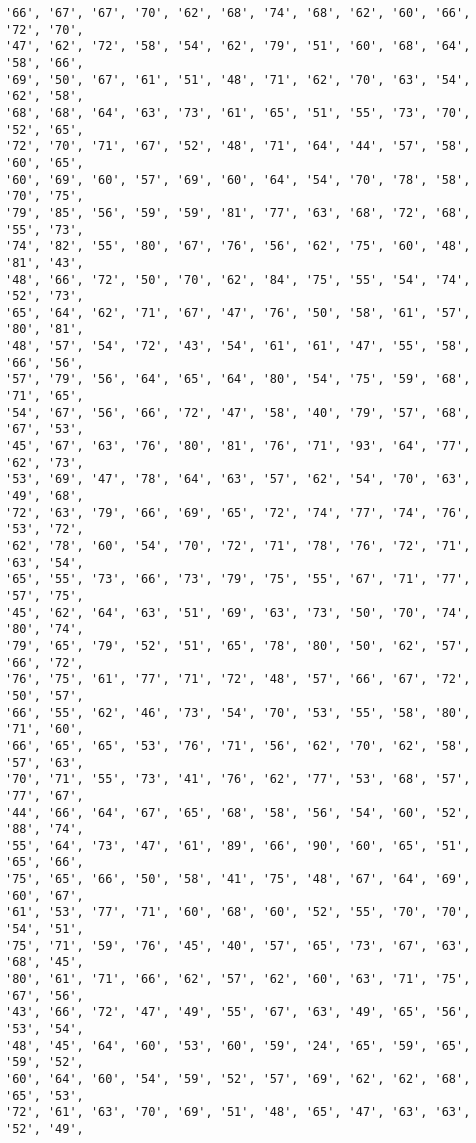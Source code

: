 \documentclass[11pt]{article}
\begin{document}
\begin{Verbatim}[commandchars=\\\{\}]
'66', '67', '67', '70', '62', '68', '74', '68', '62', '60', '66', '72', '70',
'47', '62', '72', '58', '54', '62', '79', '51', '60', '68', '64', '58', '66',
'69', '50', '67', '61', '51', '48', '71', '62', '70', '63', '54', '62', '58',
'68', '68', '64', '63', '73', '61', '65', '51', '55', '73', '70', '52', '65',
'72', '70', '71', '67', '52', '48', '71', '64', '44', '57', '58', '60', '65',
'60', '69', '60', '57', '69', '60', '64', '54', '70', '78', '58', '70', '75',
'79', '85', '56', '59', '59', '81', '77', '63', '68', '72', '68', '55', '73',
'74', '82', '55', '80', '67', '76', '56', '62', '75', '60', '48', '81', '43',
'48', '66', '72', '50', '70', '62', '84', '75', '55', '54', '74', '52', '73',
'65', '64', '62', '71', '67', '47', '76', '50', '58', '61', '57', '80', '81',
'48', '57', '54', '72', '43', '54', '61', '61', '47', '55', '58', '66', '56',
'57', '79', '56', '64', '65', '64', '80', '54', '75', '59', '68', '71', '65',
'54', '67', '56', '66', '72', '47', '58', '40', '79', '57', '68', '67', '53',
'45', '67', '63', '76', '80', '81', '76', '71', '93', '64', '77', '62', '73',
'53', '69', '47', '78', '64', '63', '57', '62', '54', '70', '63', '49', '68',
'72', '63', '79', '66', '69', '65', '72', '74', '77', '74', '76', '53', '72',
'62', '78', '60', '54', '70', '72', '71', '78', '76', '72', '71', '63', '54',
'65', '55', '73', '66', '73', '79', '75', '55', '67', '71', '77', '57', '75',
'45', '62', '64', '63', '51', '69', '63', '73', '50', '70', '74', '80', '74',
'79', '65', '79', '52', '51', '65', '78', '80', '50', '62', '57', '66', '72',
'76', '75', '61', '77', '71', '72', '48', '57', '66', '67', '72', '50', '57',
'66', '55', '62', '46', '73', '54', '70', '53', '55', '58', '80', '71', '60',
'66', '65', '65', '53', '76', '71', '56', '62', '70', '62', '58', '57', '63',
'70', '71', '55', '73', '41', '76', '62', '77', '53', '68', '57', '77', '67',
'44', '66', '64', '67', '65', '68', '58', '56', '54', '60', '52', '88', '74',
'55', '64', '73', '47', '61', '89', '66', '90', '60', '65', '51', '65', '66',
'75', '65', '66', '50', '58', '41', '75', '48', '67', '64', '69', '60', '67',
'61', '53', '77', '71', '60', '68', '60', '52', '55', '70', '70', '54', '51',
'75', '71', '59', '76', '45', '40', '57', '65', '73', '67', '63', '68', '45',
'80', '61', '71', '66', '62', '57', '62', '60', '63', '71', '75', '67', '56',
'43', '66', '72', '47', '49', '55', '67', '63', '49', '65', '56', '53', '54',
'48', '45', '64', '60', '53', '60', '59', '24', '65', '59', '65', '59', '52',
'60', '64', '60', '54', '59', '52', '57', '69', '62', '62', '68', '65', '53',
'72', '61', '63', '70', '69', '51', '48', '65', '47', '63', '63', '52', '49',

\end{Verbatim}
\end{document}

